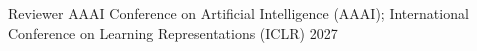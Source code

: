 
\begin{cvhonors}
  \cvhonor
    {Reviewer}
    {AAAI Conference on Artificial Intelligence (AAAI); International Conference on Learning Representations (ICLR)}
    {}
    {2027}
\end{cvhonors}
